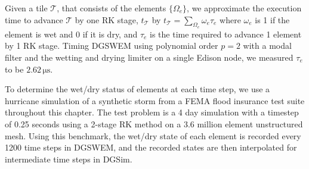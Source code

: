  Given a tile $\mathcal{T}$, that consists of the elements $\{\Omega_e\}$, we approximate the execution time to advance $\mathcal{T}$ by one RK stage, $t_{\mathcal{T}}$ by 
$t_{\mathcal{T}} = \sum_{\Omega_e} \omega_e \tau_e$ 
where $\omega_e$ is 1 if the element is wet and 0 if it is dry, and $\tau_e$ is the time required to advance 1 element by 1 RK stage.
Timing DGSWEM using polynomial order $p=2$ with a modal filter and the wetting and drying limiter on a single Edison node, we measured $\tau_e$ to be $2.62\,\mathrm{\mu s}$.

To determine the wet/dry status of elements at each time step, we use a hurricane simulation of a synthetic storm from a FEMA flood insurance test suite throughout this chapter. The test problem is a 4 day simulation with a timestep of 0.25 seconds using a 2-stage RK method on a 3.6 million element unstructured mesh.
Using this benchmark, the wet/dry state of each element is recorded every 1200 time steps in DGSWEM, and the recorded states are then interpolated for intermediate time steps in DGSim.

